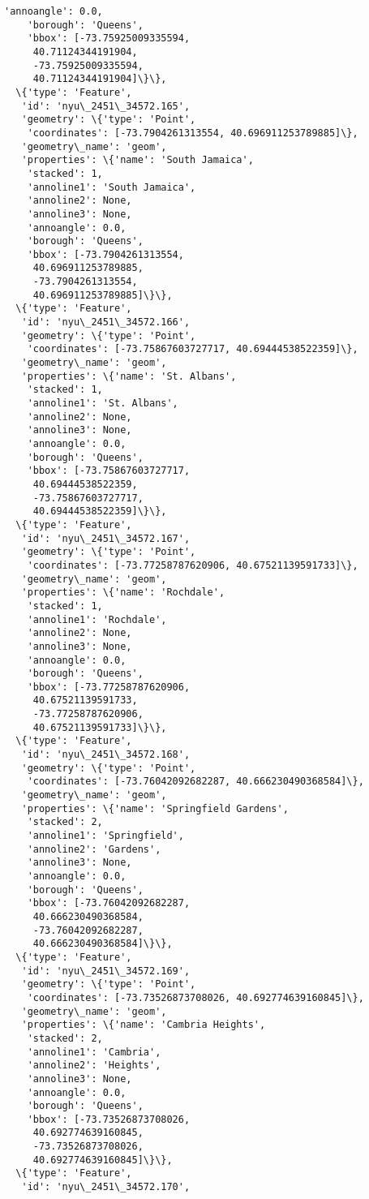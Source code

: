 \documentclass[11pt]{article}
\begin{document}
\begin{tcolorbox}[breakable, size=fbox, boxrule=.5pt, pad at break*=1mm, opacityfill=0]
\begin{Verbatim}[commandchars=\\\{\}]
    'annoangle': 0.0,
    'borough': 'Queens',
    'bbox': [-73.75925009335594,
     40.71124344191904,
     -73.75925009335594,
     40.71124344191904]\}\},
  \{'type': 'Feature',
   'id': 'nyu\_2451\_34572.165',
   'geometry': \{'type': 'Point',
    'coordinates': [-73.7904261313554, 40.696911253789885]\},
   'geometry\_name': 'geom',
   'properties': \{'name': 'South Jamaica',
    'stacked': 1,
    'annoline1': 'South Jamaica',
    'annoline2': None,
    'annoline3': None,
    'annoangle': 0.0,
    'borough': 'Queens',
    'bbox': [-73.7904261313554,
     40.696911253789885,
     -73.7904261313554,
     40.696911253789885]\}\},
  \{'type': 'Feature',
   'id': 'nyu\_2451\_34572.166',
   'geometry': \{'type': 'Point',
    'coordinates': [-73.75867603727717, 40.69444538522359]\},
   'geometry\_name': 'geom',
   'properties': \{'name': 'St. Albans',
    'stacked': 1,
    'annoline1': 'St. Albans',
    'annoline2': None,
    'annoline3': None,
    'annoangle': 0.0,
    'borough': 'Queens',
    'bbox': [-73.75867603727717,
     40.69444538522359,
     -73.75867603727717,
     40.69444538522359]\}\},
  \{'type': 'Feature',
   'id': 'nyu\_2451\_34572.167',
   'geometry': \{'type': 'Point',
    'coordinates': [-73.77258787620906, 40.67521139591733]\},
   'geometry\_name': 'geom',
   'properties': \{'name': 'Rochdale',
    'stacked': 1,
    'annoline1': 'Rochdale',
    'annoline2': None,
    'annoline3': None,
    'annoangle': 0.0,
    'borough': 'Queens',
    'bbox': [-73.77258787620906,
     40.67521139591733,
     -73.77258787620906,
     40.67521139591733]\}\},
  \{'type': 'Feature',
   'id': 'nyu\_2451\_34572.168',
   'geometry': \{'type': 'Point',
    'coordinates': [-73.76042092682287, 40.666230490368584]\},
   'geometry\_name': 'geom',
   'properties': \{'name': 'Springfield Gardens',
    'stacked': 2,
    'annoline1': 'Springfield',
    'annoline2': 'Gardens',
    'annoline3': None,
    'annoangle': 0.0,
    'borough': 'Queens',
    'bbox': [-73.76042092682287,
     40.666230490368584,
     -73.76042092682287,
     40.666230490368584]\}\},
  \{'type': 'Feature',
   'id': 'nyu\_2451\_34572.169',
   'geometry': \{'type': 'Point',
    'coordinates': [-73.73526873708026, 40.692774639160845]\},
   'geometry\_name': 'geom',
   'properties': \{'name': 'Cambria Heights',
    'stacked': 2,
    'annoline1': 'Cambria',
    'annoline2': 'Heights',
    'annoline3': None,
    'annoangle': 0.0,
    'borough': 'Queens',
    'bbox': [-73.73526873708026,
     40.692774639160845,
     -73.73526873708026,
     40.692774639160845]\}\},
  \{'type': 'Feature',
   'id': 'nyu\_2451\_34572.170',

\end{Verbatim}
\end{tcolorbox}
\end{document}
